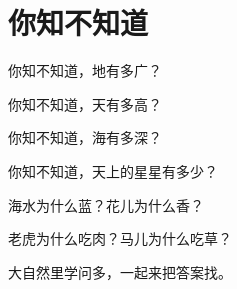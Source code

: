 \documentclass[12pt,UTF-8,openany]{ctexbook}
\begin{document}
\hanzibox{}\hanzibox{}\hanzibox{}\hanzibox{}\hspace{1em}\hanzibox{}\hanzibox{}\hanzibox{}\hanzibox{}

\hanzibox{}\hanzibox{}\hanzibox{}\hanzibox{}\hspace{1em}




\chapter{你知不知道}

\begin{large}
    
    你知不知道，地有多广？
    
    你知不知道，天有多高？
    
    你知不知道，海有多深？
    
    你知不知道，天上的星星有多少？
    
    海水为什么蓝？花儿为什么香？
    
    老虎为什么吃肉？马儿为什么吃草？
    
    大自然里学问多，一起来把答案找。
    
\end{large}


\clearpage

\begin{center}
    
    
    
\end{center}


\hanzibox{}\hanzibox{}\hanzibox{}\hanzibox{}\hspace{1em}\hanzibox{}\hanzibox{}\hanzibox{}\hanzibox{}

\hanzibox{}\hanzibox{}\hanzibox{}\hanzibox{}\hspace{1em}\hanzibox{}\hanzibox{}\hanzibox{}\hanzibox{}

\hanzibox{}\hanzibox{}\hanzibox{}\hanzibox{}\hspace{1em}\hanzibox{}\hanzibox{}\hanzibox{}\hanzibox{}

\hanzibox{}\hanzibox{}\hanzibox{}\hanzibox{}\hspace{1em}
\end{document}
